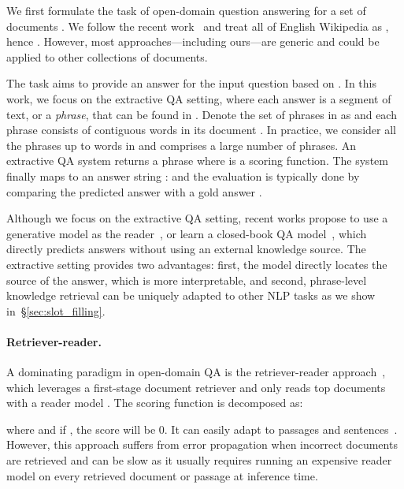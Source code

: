 \documentclass[11pt,a4paper]{article}
\newcommand\ti[1]{\textit{#1}}
\newcommand{\draftonly}[1]{#1}
\newcommand{\draftcomment}[3]{\draftonly{\textcolor{#2}{{{[#1: #3]}}}}}
\newcommand{\jinhyuk}[1]{\draftcomment{Jinhyuk}{blue}{#1}}
\begin{document}
We first formulate the task of open-domain question answering for a set of  documents .
We follow the recent work~\cite{chen2017reading,lee2019latent} and treat all of English Wikipedia as , hence .
However, most approaches---including ours---are generic and could be applied to other collections of documents.

The task aims to provide an answer  for the input question  based on .
In this work, we focus on the extractive QA setting, where each answer is a segment of text, or a \ti{phrase}, that can be found in .
Denote the set of phrases in  as  and each phrase  consists of contiguous words  in its document .
In practice, we consider all the phrases up to  words in  and  comprises a large number of  phrases.
An extractive QA system returns a phrase  where  is a scoring function. The system finally maps  to an answer string :  and the evaluation is typically done by comparing the predicted answer  with a gold answer .

Although we focus on the extractive QA setting, recent works propose to use a generative model as the reader~\citep{lewis2020retrieval,izacard2020leveraging}, or learn a closed-book QA model~\citep{roberts2020much}, which directly predicts answers  without using an external knowledge source. The extractive setting provides two advantages: first, the model directly locates the source of the answer, which is more interpretable, and second, phrase-level knowledge retrieval can be uniquely adapted to other NLP tasks as we show in~\S\ref{sec:slot_filling}.

\paragraph{Retriever-reader.}
A dominating paradigm in open-domain QA is the retriever-reader approach~\cite{chen2017reading,lee2019latent,karpukhin2020dense}, which leverages a first-stage document retriever  and only reads top  documents with a reader model . The scoring function  is decomposed as:
\vspace{-0.3em}

where  and if , the score will be 0.
It can easily adapt to passages and sentences~\cite{yang2019end,wang2019multi}.
However, this approach suffers from error propagation when incorrect documents are retrieved and can be slow as it usually requires running an expensive reader model on every retrieved document or passage at inference time.


\begin{comment}
\paragraph{Reader Only}
A second paradigm, the reader only approach~\citep{roberts2020much} (also known as a closed-book models\jinhyuk{add EaE?} merely depends on parameters of language models () to store all the factual knowledge:

This approach requires gigantic language models (e.g., T5 models with 11G parameters) to achieve competitive performance. It is also known that these models perform more question memorization than generalization~\cite{lewis2020question}.
\end{comment}
\end{document}
